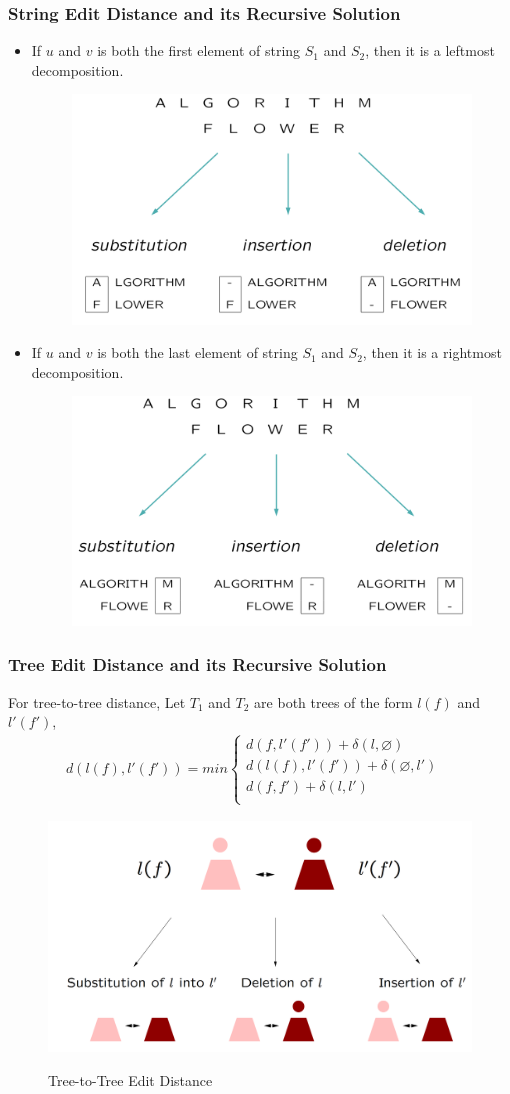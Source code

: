 \documentclass{beamer}
\begin{document}
\begin{frame}
\frametitle{String Edit Distance and its Recursive Solution}
\begin{itemize}
\item If $u$ and $v$ is both the first element of string $S_1$ and $S_2$, then it is a leftmost decomposition.
\begin{figure}
	\includegraphics[width=0.4\linewidth]{StringRecursion1}
	\label{String Leftmost Decomposition} 
	\centering
\end{figure}
\item If $u$ and $v$ is both the last element of string $S_1$ and $S_2$, then it is a rightmost decomposition.
\begin{figure}
	\includegraphics[width=0.4\linewidth]{StringRecursion2}
	\label{String Rightmost Decomposition} 
	\centering
\end{figure}
\end{itemize}
\end{frame}
\begin{frame}
\frametitle{Tree Edit Distance and its Recursive Solution}
For tree-to-tree distance,
Let $T_1$ and $T_2$ are both trees of the form $l(f)$ and $l'(f')$, 
\begin{align*}
d(l(f), l'(f')) = min \begin{cases}
	  	d(f, l'(f')) + \delta(l, \varnothing) \\ 
      	d(l(f), l'(f')) + \delta(\varnothing, l') \\ 
    	d(f, f') + \delta(l, l') & \\
    \end{cases}
\end{align*}
\begin{figure}
	\includegraphics[width=0.6\linewidth]{TreeToTree}
	\label{Tree-to-Tree Edit Distance} 
	\caption{Tree-to-Tree Edit Distance}
	\centering
\end{figure}
\end{frame}
\end{document}
